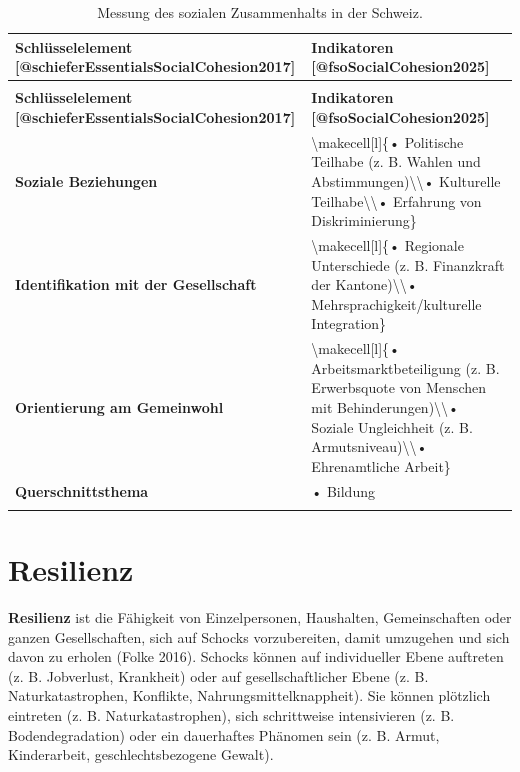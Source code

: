 \documentclass[
  nswissgerman,
  a4paper,
  openany]{book}
\begin{document}
\begin{longtable}[t]{>{\raggedright\arraybackslash}p{5.5cm}>{\raggedright\arraybackslash}p{5.5cm}}

\caption{\label{tbl-social-cohesion-switzerland}Messung des sozialen
Zusammenhalts in der Schweiz.}

\tabularnewline

\toprule
\textbf{Schlüsselelement [@schieferEssentialsSocialCohesion2017]} & \textbf{Indikatoren [@fsoSocialCohesion2025]}\\
\midrule
\endfirsthead
\multicolumn{2}{@{}l}{\textit{(continued)}}\\
\toprule
\textbf{Schlüsselelement [@schieferEssentialsSocialCohesion2017]} & \textbf{Indikatoren [@fsoSocialCohesion2025]}\\
\midrule
\endhead

\endfoot
\bottomrule
\endlastfoot
\textbf{Soziale Beziehungen} & \textbackslash{}makecell[l]\{• Politische Teilhabe (z. B. Wahlen und Abstimmungen)\textbackslash{}\textbackslash{}• Kulturelle Teilhabe\textbackslash{}\textbackslash{}• Erfahrung von Diskriminierung\}\\
\textbf{Identifikation mit der Gesellschaft} & \textbackslash{}makecell[l]\{• Regionale Unterschiede (z. B. Finanzkraft der Kantone)\textbackslash{}\textbackslash{}• Mehrsprachigkeit/kulturelle Integration\}\\
\textbf{Orientierung am Gemeinwohl} & \textbackslash{}makecell[l]\{• Arbeitsmarktbeteiligung (z. B. Erwerbsquote von Menschen mit Behinderungen)\textbackslash{}\textbackslash{}• Soziale Ungleichheit (z. B. Armutsniveau)\textbackslash{}\textbackslash{}• Ehrenamtliche Arbeit\}\\
\textbf{Querschnittsthema} & • Bildung\\*

\end{longtable}

\endgroup{}

\section{Resilienz}\label{resilienz}

\textbf{Resilienz} ist die Fähigkeit von Einzelpersonen, Haushalten,
Gemeinschaften oder ganzen Gesellschaften, sich auf Schocks
vorzubereiten, damit umzugehen und sich davon zu erholen (Folke 2016).
Schocks können auf individueller Ebene auftreten (z. B. Jobverlust,
Krankheit) oder auf gesellschaftlicher Ebene (z. B. Naturkatastrophen,
Konflikte, Nahrungsmittelknappheit). Sie können plötzlich eintreten (z.
B. Naturkatastrophen), sich schrittweise intensivieren (z. B.
Bodendegradation) oder ein dauerhaftes Phänomen sein (z. B. Armut,
Kinderarbeit, geschlechtsbezogene Gewalt).
\end{document}
